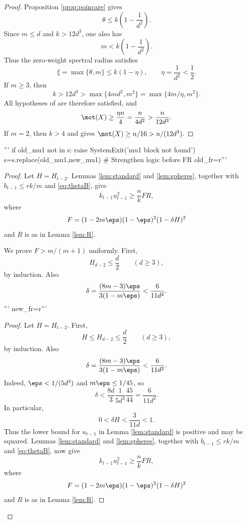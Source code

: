 \begin{proof}
Proposition \ref{prop:poincare} gives
\[
 \theta\le k\left(1-\frac1{d^2}\right).
\]
Since $m\le d$ and $k>12d^3$, one also has
\[
 m<k\left(1-\frac1{d^2}\right).
\]
Thus the zero-weight spectral radius satisfies
\[
 \xi=\max\{\theta,m\}\le k(1-\eta),
 \qquad \eta=\frac1{d^2}<\frac12.
\]
If $m\ge3$, then
\[
 k>12d^3>\max\{4md^2,m^2\}
 =\max\{4m/\eta,m^2\}.
\]
All hypotheses of \cite[Proposition 2.14]{PS} are therefore satisfied, and
\[
 \mot(X)\ge\frac{\eta n}{4}=\frac{n}{4d^2}
 >\frac{n}{12d^3}.
\]
If $m=2$, then $k>4$ and \cite[Proposition 2.15]{PS} gives
$\mot(X)\ge n/16>n/(12d^3)$.
\end{proof}'''
if old_mu1 not in s:
    raise SystemExit('mu1 block not found')
s=s.replace(old_mu1,new_mu1)
# Strengthen logic before FR
old_fr=r'''\begin{proof}
Let $H=H_{t-2}$.  Lemmas \ref{lem:standard} and \ref{lem:spheres}, together with
$b_{t-1}\le rk/m$ and \eqref{eq:thetaB}, give
\begin{equation}\label{eq:FR}
 k_{t-1}u_{t-1}^2\ge\frac{n}{k}FR,
\end{equation}
where
\[
 F=(1-2m\eps)(1-\eps)^2(1-\delta H)^2
\]
and $R$ is as in Lemma \ref{lem:R}.

We prove $F>m/(m+1)$ uniformly.  First,
\[
 H_{d-2}\le\frac d2\qquad(d\ge3),
\]
by induction.  Also
\[
 \delta=\frac{(8m-3)\eps}{3(1-m\eps)}
 <\frac{6}{11d^2}.
\]'''
new_fr=r'''\begin{proof}
Let $H=H_{t-2}$.  First,
\[
 H\le H_{d-2}\le\frac d2\qquad(d\ge3),
\]
by induction.  Also
\[
 \delta=\frac{(8m-3)\eps}{3(1-m\eps)}
 <\frac{6}{11d^2}.
\]
Indeed, $\eps<1/(5d^3)$ and $m\eps\le1/45$, so
\[
 \delta<\frac{8d}{3}\frac1{5d^3}\frac{45}{44}
 =\frac6{11d^2}.
\]
In particular,
\[
 0<\delta H<\frac{3}{11d}<1.
\]
Thus the lower bound for $u_{t-1}$ in Lemma \ref{lem:standard} is positive and may be squared.  Lemmas \ref{lem:standard} and \ref{lem:spheres}, together with
$b_{t-1}\le rk/m$ and \eqref{eq:thetaB}, now give
\begin{equation}\label{eq:FR}
 k_{t-1}u_{t-1}^2\ge\frac{n}{k}FR,
\end{equation}
where
\[
 F=(1-2m\eps)(1-\eps)^2(1-\delta H)^2
\]
and $R$ is as in Lemma \ref{lem:R}.


\end{proof}
\end{proof}
